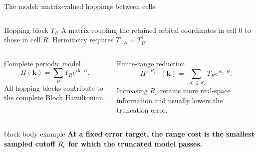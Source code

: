 \documentclass[aspectratio=169,10pt]{beamer}
\begin{document}
\begin{frame}{The model: matrix-valued hoppings between cells}
  \small
  \begin{columns}[T]
      \centering
      \begin{block}{Hopping block $T_R$}
        A matrix coupling the retained orbital coordinates in cell $0$ to those in cell
        $R$. Hermiticity requires $T_{-R}=T_R^\dagger$.
      \end{block}
  \end{columns}
  \vspace{0.55em}
  \begin{columns}[T]
      \begin{exampleblock}{Complete periodic model}
        \[
          H(\mathbf k)=\sum_R T_R e^{i\mathbf k\cdot R}.
        \]
        All hopping blocks contribute to the complete Bloch Hamiltonian.
      \end{exampleblock}
      \begin{block}{Finite-range reduction}
        \[
          H^{(R_c)}(\mathbf k)
          =\sum_{|R|\le R_c}T_R e^{i\mathbf k\cdot R}.
        \]
        Increasing $R_c$ retains more real-space information and usually lowers the
        truncation error.
      \end{block}
  \end{columns}
  \vspace{0.2em}
  \begin{beamercolorbox}[rounded=true,sep=0.45em,wd=\textwidth]{block body example}
    \centering\bfseries\color{resultblue}
    At a fixed error target, the range cost is the smallest sampled cutoff $R_c$ for
    which the truncated model passes.
  \end{beamercolorbox}
\end{frame}
\end{document}
